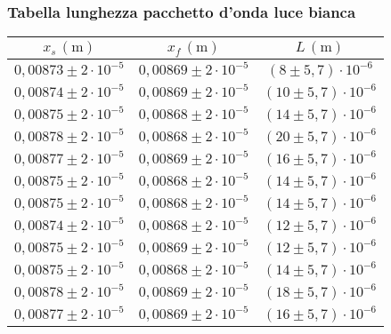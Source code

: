 \subsubsection{Tabella lunghezza pacchetto d'onda luce bianca}
    \begin{table}[H]
    \centering
        \begin{tabular}{|c|c|c|}
        \hline
        $ x_s \, (\text{m}) $ & $ x_f \, (\text{m}) $ & $ L \, (\text{m}) $ \\
        \hline
        $0,00873 \pm 2 \cdot 10^{-5}$ & $0,00869 \pm 2 \cdot 10^{-5}$ & $(8 \pm 5,7) \cdot 10^{-6}$ \\
        \hline
        $0,00874 \pm 2 \cdot 10^{-5}$ & $0,00869 \pm 2 \cdot 10^{-5}$ & $(10 \pm 5,7) \cdot 10^{-6}$ \\
        \hline
        $0,00875 \pm 2 \cdot 10^{-5}$ & $0,00868 \pm 2 \cdot 10^{-5}$ & $(14 \pm 5,7) \cdot 10^{-6}$ \\
        \hline
        $0,00878 \pm 2 \cdot 10^{-5}$ & $0,00868 \pm 2 \cdot 10^{-5}$ & $(20 \pm 5,7) \cdot 10^{-6}$ \\
        \hline
        $0,00877 \pm 2 \cdot 10^{-5}$ & $0,00869 \pm 2 \cdot 10^{-5}$ & $(16 \pm 5,7) \cdot 10^{-6}$ \\
        \hline
        $0,00875 \pm 2 \cdot 10^{-5}$ & $0,00868 \pm 2 \cdot 10^{-5}$ & $(14 \pm 5,7) \cdot 10^{-6}$ \\
        \hline
        $0,00875 \pm 2 \cdot 10^{-5}$ & $0,00868 \pm 2 \cdot 10^{-5}$ & $(14 \pm 5,7) \cdot 10^{-6}$ \\
        \hline
        $0,00874 \pm 2 \cdot 10^{-5}$ & $0,00868 \pm 2 \cdot 10^{-5}$ & $(12 \pm 5,7) \cdot 10^{-6}$ \\
        \hline
        $0,00875 \pm 2 \cdot 10^{-5}$ & $0,00869 \pm 2 \cdot 10^{-5}$ & $(12 \pm 5,7) \cdot 10^{-6}$ \\
        \hline
        $0,00875 \pm 2 \cdot 10^{-5}$ & $0,00868 \pm 2 \cdot 10^{-5}$ & $(14 \pm 5,7) \cdot 10^{-6}$ \\
        \hline
        $0,00878 \pm 2 \cdot 10^{-5}$ & $0,00869 \pm 2 \cdot 10^{-5}$ & $(18 \pm 5,7) \cdot 10^{-6}$ \\
        \hline
        $0,00877 \pm 2 \cdot 10^{-5}$ & $0,00869 \pm 2 \cdot 10^{-5}$ & $(16 \pm 5,7) \cdot 10^{-6}$ \\
        \hline
        \end{tabular}
    \end{table}
